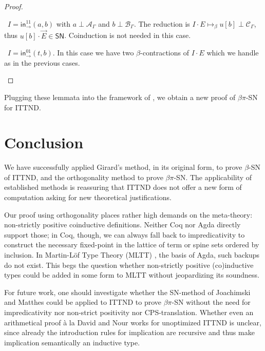 \documentclass[a4paper,USenglish,cleveref, autoref, thm-restate]{lipics-v2019}
\newenvironment{caselist}{%
  \begin{list}{{\it Case}}{%
  }%
}{\end{list}%
}
\newcommand{\nextcase}{\item~}
\newcommand{\tin}{\ensuremath{\mathsf{in}}}
\newcommand{\inn}[2]{\ensuremath{\tin_{#1}^{#2}}}
\newcommand{\contract}[1][]{\mapsto_{#1}}
\newcommand{\A}{\mathcal{A}}
\newcommand{\B}{\mathcal{B}}
\newcommand{\C}{\mathcal{C}}
\newcommand{\SN}{\mathsf{SN}}
\begin{document}
\begin{proof}
\begin{caselist}
    \nextcase $I = \inn\to{11}(a,b)$ with $a \perp \A_\Gamma$ and
    $b \perp \B_\Gamma$.
    The reduction is
    $I \cdot E \contract[\beta] u[b] \perp \C_\Gamma$, thus $u[b]
    \cdot \vec E \in \SN$.
    Coinduction is not needed in this case.

    \nextcase $I = \inn\to{01}(t,b)$.  In this case we have two
      $\beta$-contractions of $I \cdot E$ which we handle as in the
      previous cases.
  \popQED
  \end{caselist}
\end{proof}

Plugging these lemmata into the framework of , we
obtain a new proof of $\beta\pi$-SN for ITTND.

\section{Conclusion}
\label{sec:concl}

We have successfully applied Girard's method, in its original form, to
prove $\beta$-SN of ITTND, and the orthogonality method to prove
$\beta\pi$-SN.  The applicability of established methods is reassuring
that ITTND does not offer a new form of computation asking for new
theoretical justifications.

Our proof using orthogonality places rather high demands on the
meta-theory: non-strictly positive coinductive definitions.  Neither
Coq nor Agda directly support those; in Coq, though, we can always
fall back to impredicativity to construct the necessary fixed-point in
the lattice of term or spine sets ordered by inclusion.  In
Martin-L\"of Type Theory (MLTT) \cite{MartinLoef84}, the basis of
Agda, such backups do not exist.  This begs the question whether
non-strictly positive (co)inductive types could be added in some form
to MLTT without jeopardizing its soundness.

For future work, one should investigate whether the SN-method of
Joachimski and Matthes \cite{matthes:shortproofs,matthes:classlog}
could be applied to
ITTND to prove $\beta\pi$-SN without the need for impredicativity nor
non-strict positivity nor CPS-translation.  Whether even an
arithmetical proof \`a la David and Nour
\cite{david:normWithoutRed,davidNour:tlca05} works for unoptimized
ITTND is unclear, since already the introduction rules for implication
are recursive and thus make implication semantically an inductive type.
\end{document}
